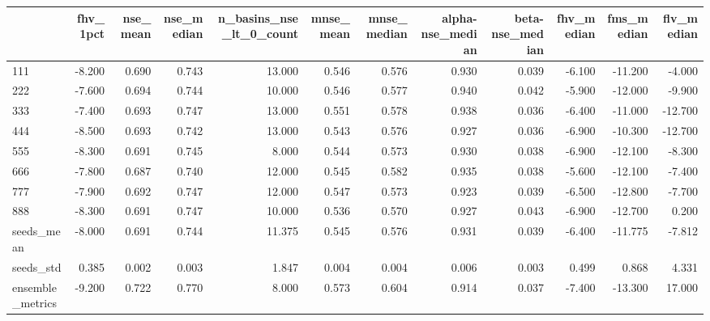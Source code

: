 \begin{tabular}{lrrrrrrrrrrr}
\toprule
 & fhv_1pct & nse_mean & nse_median & n_basins_nse_lt_0_count & mnse_mean & mnse_median & alpha-nse_median & beta-nse_median & fhv_median & fms_median & flv_median \\
\midrule
111 & -8.200 & 0.690 & 0.743 & 13.000 & 0.546 & 0.576 & 0.930 & 0.039 & -6.100 & -11.200 & -4.000 \\
222 & -7.600 & 0.694 & 0.744 & 10.000 & 0.546 & 0.577 & 0.940 & 0.042 & -5.900 & -12.000 & -9.900 \\
333 & -7.400 & 0.693 & 0.747 & 13.000 & 0.551 & 0.578 & 0.938 & 0.036 & -6.400 & -11.000 & -12.700 \\
444 & -8.500 & 0.693 & 0.742 & 13.000 & 0.543 & 0.576 & 0.927 & 0.036 & -6.900 & -10.300 & -12.700 \\
555 & -8.300 & 0.691 & 0.745 & 8.000 & 0.544 & 0.573 & 0.930 & 0.038 & -6.900 & -12.100 & -8.300 \\
666 & -7.800 & 0.687 & 0.740 & 12.000 & 0.545 & 0.582 & 0.935 & 0.038 & -5.600 & -12.100 & -7.400 \\
777 & -7.900 & 0.692 & 0.747 & 12.000 & 0.547 & 0.573 & 0.923 & 0.039 & -6.500 & -12.800 & -7.700 \\
888 & -8.300 & 0.691 & 0.747 & 10.000 & 0.536 & 0.570 & 0.927 & 0.043 & -6.900 & -12.700 & 0.200 \\
seeds_mean & -8.000 & 0.691 & 0.744 & 11.375 & 0.545 & 0.576 & 0.931 & 0.039 & -6.400 & -11.775 & -7.812 \\
seeds_std & 0.385 & 0.002 & 0.003 & 1.847 & 0.004 & 0.004 & 0.006 & 0.003 & 0.499 & 0.868 & 4.331 \\
ensemble_metrics & -9.200 & 0.722 & 0.770 & 8.000 & 0.573 & 0.604 & 0.914 & 0.037 & -7.400 & -13.300 & 17.000 \\
\bottomrule
\end{tabular}
